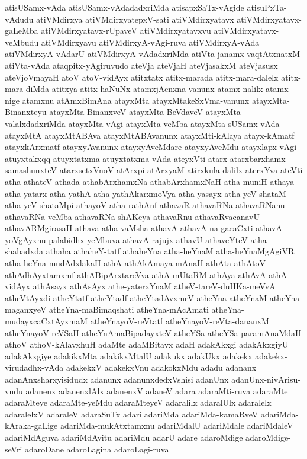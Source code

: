 {atisUSamx-vAda
atisUSamx-vAdadadxriMda
atisapxSaTx-vAgide
atisuPxTa-vAdudu
atiVMdirxya
atiVMdirxyatepxV-sati
atiVMdirxyatavx
atiVMdirxyatavx-gaLeMba
atiVMdirxyatavx-rUpaveV
atiVMdirxyatavxvu
atiVMdirxyatavx-veMbudu
atiVMdirxyavu
atiVMdirxyA-vAgi-ruva
atiVMdirxyA-vAda
atiVMdirxyA-vAdarU
atiVMdirxyA-vAdadxriMda
atiVta-janamx-vaqtAtxnatxM
atiVta-vAda
ataqpitx-yAgiruvudo
ateVja
ateVjaH
ateVjasakxM
ateVjasusx
ateVjoVmayaH
atoV
atoV-vidAyx
atitxtatx
atitx-marada
atitx-mara-dalelx
atitx-mara-diMda
atitxya
atitx-haNuNx
atamxjAcnxna-vanunx
atamx-nalilx
atamx-nige
atamxnu
atAmxBimAna
atayxMta
atayxMtakeSxVma-vanunx
atayxMta-Binanxteyu
atayxMta-BinanxveV
atayxMta-BeVdaveV
atayxMta-valalxdadxriMda
atayxMta-vAgi
atayxMta-veMba
atayxMta-sUSamx-vAda
atayxMtA
atayxMtABAva
atayxMtABAvanunx
atayxMti-kAlaya
atayx-kAmatf
atayxkArxmatf
atayxyAvanunx
atayxyAveMdare
atayxyAveMdu
atayxlapx-vAgi
atuyxtakxqq
atuyxtatxma
atuyxtatxma-vAda
ateyxVti
atarx
atarxbarxhamx-samashunxteV
atarxsetxVnoV
atArxpi
atArxyaM
atirxkula-dalilx
aterxYva
ateVti
atha
athateV
athada
athabArxhamxNa
athabArxhamxNaH
atha-muniH
athaya
atha-yatarx
atha-yathA
atha-yathAkarxmoVya
atha-yasayx
atha-yeV-shataM
atha-yeV-shataMpi
athayoV
atha-rathAnf
athavaR
athavaRNa
athavaRNanu
athavaRNa-veMba
athavaRNa-shAKeya
athavaRnu
athavaRvacanavU
athavARMgirasaH
athava
atha-vaMsha
athavA
athavA-na-gacaCxti
athavA-yoVgAyxnu-palabidhx-yeMbuva
athavA-rajujx
athavU
athaveYteV
atha-shabadxda
athaha
athaheY-tatf
athaheYna
atha-heYnaM
atha-heYnaMgAgiVR
atha-heYna-mudAdxlakaH
athA
athAkAmaya-mAnaH
athAta
athAtoV
athAdhAyxtamxmf
athABipArxtareVva
athA-mUtaRM
athAya
athAvA
athA-vidAyx
athAsayx
athAsAyx
athe-yaterxYnaM
atheV-tareV-duHKa-meVvA
atheVtAyxdi
atheYtatf
atheYtadf
atheYtadAvxmeV
atheYna
atheYnaM
atheYna-maganxyeV
atheYna-maBimaqshati
atheYna-mAcAmati
atheYna-mudayxcaCxtAyxmaM
atheYnayoV-reVtatf
atheYnayoV-reVta-dananxM
atheYnayoV-reVSaH
atheYnAmaBipadayxteV
atheYSa
atheYSa-paramAnaMdaH
athoV
athoV-kAlavxhuH
adaMte
adaMBitavx
adaH
adakAkxgi
adakAkxgiyU
adakAkxgiye
adakikxMta
adakikxMtalU
adakukx
adakUkx
adakekx
adakekx-virudadhx-vAda
adakekxV
adakekxVnu
adakokxMdu
adadu
adananx
adanAnxsharxyisidudx
adanunx
adanunxdedxVshisi
adanUnx
adanUnx-nivArisu-vudu
adanenx
adanenxlAlx
adanenxV
adaneV
adara
adaraMti-ruva
adaraMte
adaraMteye
adaraMte-yeMdu
adaraMteyeV
adaralilx
adaralUlx
adaralelx
adaralelxV
adaraleV
adaraSuTx
adari
adariMda
adariMda-kamaRveV
adariMda-kAraka-gaLige
adariMda-mukAtxtamxnu
adariMdalU
adariMdale
adariMdaleV
adariMdAguva
adariMdAyitu
adariMdu
adarU
adare
adaroMdige
adaroMdige-seVri
adaroDane
adaroLagina
adaroLagi-ruva
}

